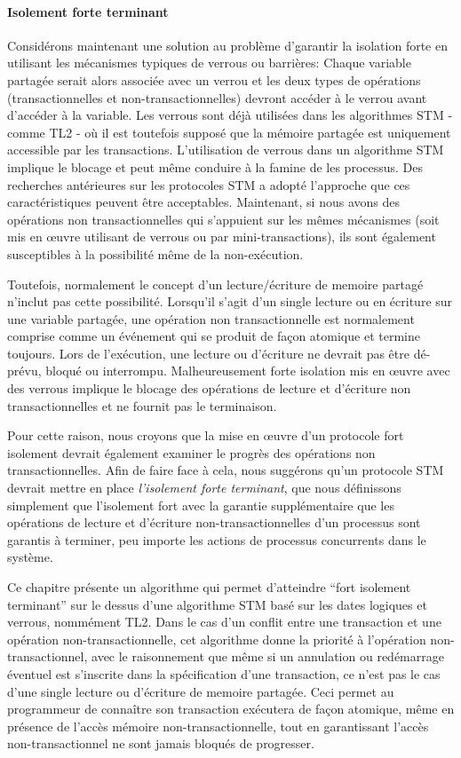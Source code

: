 \paragraph{Isolement forte terminant}

Considérons maintenant une solution au problème d'garantir la isolation forte en utilisant les mécanismes typiques de verrous ou barrières:
Chaque variable partagée serait alors associée avec un verrou et les deux types de opérations (transactionnelles et non-transactionnelles) devront accéder à le verrou avant d'accéder à la variable.
Les verrous sont déjà utilisées dans les algorithmes STM - comme TL2 \cite{DSS06} - où il est toutefois supposé que la mémoire partagée est uniquement accessible par les transactions.
L'utilisation de verrous dans un algorithme STM implique le blocage et peut même conduire à la famine de les processus.
Des recherches antérieures sur les protocoles STM a adopté l'approche que ces caractéristiques peuvent être acceptables.
Maintenant, si nous avons des opérations non transactionnelles qui s'appuient sur les mêmes mécanismes (soit mis en œuvre utilisant de verrous ou par mini-transactions),
ils sont également susceptibles à la possibilité même de la non-exécution.


Toutefois, normalement le concept d'un lecture/écriture de memoire partagé n'inclut pas cette possibilité.
Lorsqu'il s'agit d'un single lecture ou en écriture sur une variable partagée, une opération non transactionnelle est normalement comprise comme un événement qui se produit de façon atomique et termine toujours.
Lors de l'exécution, une lecture ou d'écriture ne devrait pas être dé-prévu, bloqué ou interrompu.
Malheureusement forte isolation mis en œuvre avec des verrous implique le blocage des opérations de lecture et d'écriture non transactionnelles et ne fournit pas le terminaison.



Pour cette raison, nous croyons que la mise en œuvre d'un protocole fort isolement devrait également examiner le progrès des opérations non transactionnelles.
Afin de faire face à cela, nous suggérons qu'un protocole STM devrait mettre en place \emph{l'isolement forte terminant},
que nous définissons simplement que l'isolement fort avec la garantie supplémentaire que les opérations de lecture et d'écriture non-transactionnelles d'un processus sont garantis à terminer,
peu importe les actions de processus concurrents dans le système.


Ce chapitre présente un algorithme qui permet d'atteindre ``fort isolement terminant'' sur le dessus d'une algorithme STM basé sur les dates logiques et verrous, nommément TL2.
Dans le cas d'un conflit entre une transaction et une opération non-transactionnelle, cet algorithme donne la priorité à l'opération non-transactionnel,
avec le raisonnement que même si un annulation ou redémarrage éventuel est s'inscrite dans la spécification d'une transaction, ce n'est pas le cas d'une single lecture ou d'écriture de memoire partagée.
Ceci permet au programmeur de connaître son transaction exécutera de façon atomique, même en présence de l'accès mémoire non-transactionnelle,
tout en garantissant l'accès non-transactionnel ne sont jamais bloqués de progresser.



